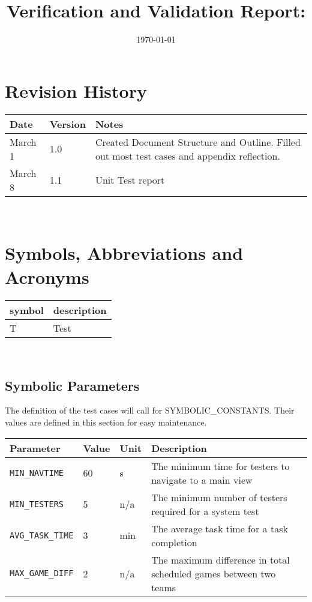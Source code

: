 \documentclass[12pt, titlepage]{article}
\begin{document}
\title{Verification and Validation Report: \progname} 
\author{\authname}
\date{\today}
	
\maketitle


\section{Revision History}

\begin{tabularx}{\textwidth}{p{3cm}p{2cm}X}
  \toprule {\bf Date} & {\bf Version} & {\bf Notes}\\
  \midrule
  March 1 & 1.0 & Created Document Structure and Outline. Filled out most test cases and appendix reflection. \\
  March 8 & 1.1 & Unit Test report\\
  \bottomrule
  \end{tabularx}

~\newpage

\section{Symbols, Abbreviations and Acronyms}

\renewcommand{\arraystretch}{1.2}
\begin{tabular}{l l} 
  \toprule		
  \textbf{symbol} & \textbf{description}\\
  \midrule 
  T & Test\\
  \bottomrule
\end{tabular}\\

\subsection{Symbolic Parameters}

The definition of the test cases will call for SYMBOLIC\_CONSTANTS.
Their values are defined in this section for easy maintenance.
\begin{longtable}{|l|l|l|p{5cm}|}
    \hline
    Parameter & Value & Unit & Description \\
    \hline
    \label{MIN_NAVTIME} \texttt{MIN\_NAVTIME} & 60 & s & The minimum time for testers to navigate to a main view \\
    \hline
    \label{MIN_TESTERS} \texttt{MIN\_TESTERS} & 5 & n/a & The minimum number of testers required for a system test \\
    \hline
    \label{AVG_TASK_TIME} \texttt{AVG\_TASK\_TIME} & 3 & min & The average task time for a task completion \\
    \hline
    \label{MAX_GAME_DIFF} \texttt{MAX\_GAME\_DIFF} & 2 & n/a & The maximum difference in total scheduled games between two teams \\
    \hline
\end{longtable}
\end{document}
